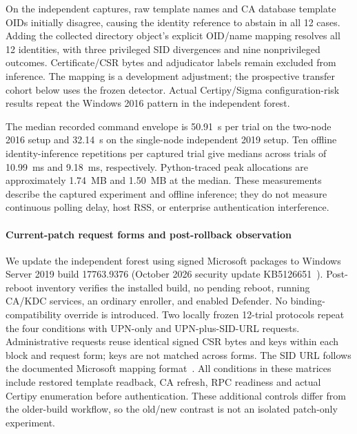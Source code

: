 On the independent captures, raw template names and CA database template OIDs initially disagree, causing the identity reference to abstain in all 12 cases. Adding the collected directory object's explicit OID/name mapping resolves all 12 identities, with three privileged SID divergences and nine nonprivileged outcomes. Certificate/CSR bytes and adjudicator labels remain excluded from inference. The mapping is a development adjustment; the prospective transfer cohort below uses the frozen detector. Actual Certipy/Sigma configuration-risk results repeat the Windows 2016 pattern in the independent forest.

The median recorded command envelope is 50.91~s per trial on the two-node 2016 setup and 32.14~s on the single-node independent 2019 setup. Ten offline identity-inference repetitions per captured trial give medians across trials of 10.99~ms and 9.18~ms, respectively. Python-traced peak allocations are approximately 1.74~MB and 1.50~MB at the median. These measurements describe the captured experiment and offline inference; they do not measure continuous polling delay, host RSS, or enterprise authentication interference.

\paragraph{Current-patch request forms and post-rollback observation}
We update the independent forest using signed Microsoft packages to Windows Server 2019 build 17763.9376 (October 2026 security update KB5126651~\cite{microsoft2026october2019}). Post-reboot inventory verifies the installed build, no pending reboot, running CA/KDC services, an ordinary enroller, and enabled Defender. No binding-compatibility override is introduced. Two locally frozen 12-trial protocols repeat the four conditions with UPN-only and UPN-plus-SID-URL requests. Administrative requests reuse identical signed CSR bytes and keys within each block and request form; keys are not matched across forms. The SID URL follows the documented Microsoft mapping format~\cite{microsoft2025pkcasid}. All conditions in these matrices include restored template readback, CA refresh, RPC readiness and actual Certipy enumeration before authentication. These additional controls differ from the older-build workflow, so the old/new contrast is not an isolated patch-only experiment.



